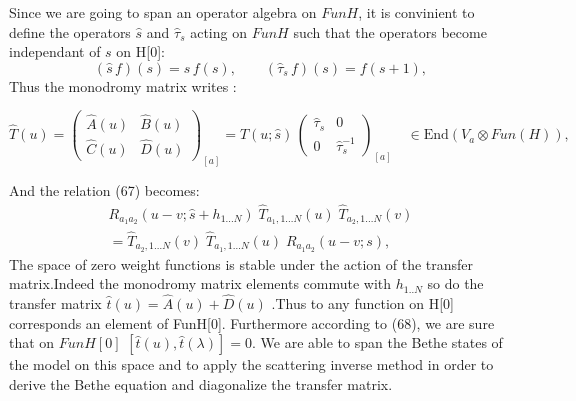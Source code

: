 \documentclass[12pt]{article}
\begin{document}
Since we are going to span an operator algebra on $FunH$, it is convinient to define the operators $\widehat{s}$ and $\widehat{\tau}_s$ acting on $ FunH$ such that the operators become independant of $s$ on H[0]:
\begin{equation}
    (\widehat{s}\, f)(s)= s\, f(s), \qquad (\widehat{\tau}_s \, f)(s)= f(s+1),
\end{equation}
Thus the monodromy matrix writes :

\begin{equation}\label{mon-op}
   \widehat{T}(u)= \begin{pmatrix} \widehat{A}(u) & \widehat{B}(u) \\
                                    \widehat{C}(u) & \widehat{D}(u) \end{pmatrix}_{\!\! [a]} 
                            = T(u; \widehat{s}) \, \begin{pmatrix} \widehat{\tau}_s & 0 \\ 0 & \widehat{\tau}_s^{-1}\end{pmatrix}_{\!\! [a]}       
           \quad \in\mathrm{End}(V_a\otimes Fun(H)) ,            
\end{equation}

And the relation (67) becomes:
\begin{multline}\label{RTT}
R_{a_1 a_2} (u-v ; \widehat{s} + h_{1\ldots N}) \;
        \widehat{T}_{a_1, 1\ldots N}(u) \; \widehat{T}_{a_2, 1\ldots N}(v) \\
= \widehat{T}_{a_2, 1\ldots N}(v)\;  \widehat{T}_{a_1, 1\ldots N}(u) \;
   R_{a_1 a_2} (u-v ; s),
\end{multline}
The space of zero weight functions is stable under the action of the transfer matrix.Indeed the monodromy matrix elements commute with  $h_{1..N}$ so do the transfer matrix  $\widehat{t}(u)=\widehat{A}(u)+\widehat{D}(u)$ .Thus to any function on H[0] corresponds an element of FunH[0]. Furthermore according to (68), we are sure that on $FunH[0]$ $[\widehat{t}(u),\widehat{t}(\lambda)]=0$. We are able to span the Bethe states of the model on this space and to apply the scattering inverse method in order to derive the Bethe equation and diagonalize the transfer matrix.
\end{document}
